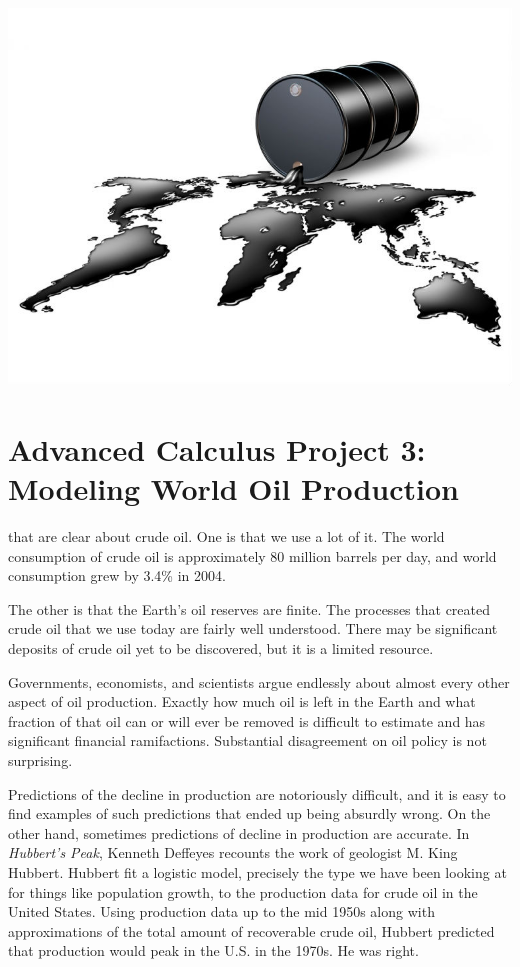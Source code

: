 \documentclass
[justified,nohyper]
{tufte-handout}
\begin{document}
\begin{center}
\includegraphics[scale=0.3]{oil.jpg}
\end{center}
\section{Advanced Calculus Project 3: Modeling World Oil Production}
 that are clear about crude oil. One is that we use a lot of it. The world consumption of crude oil is approximately 80 million barrels per day, and world consumption grew by 3.4\% in 2004.

The other is that the Earth's oil reserves are finite. The processes that created crude oil that we use today are fairly well understood. There may be significant deposits of crude oil yet to be discovered, but it is a limited resource.

Governments, economists, and scientists argue endlessly about almost every other aspect of oil production. Exactly how much oil is left in the Earth and what fraction of that oil can or will ever be removed is difficult to estimate and has significant financial ramifactions. Substantial disagreement on oil policy is not surprising.

Predictions of the decline in production are notoriously difficult, and it is easy to find examples of such predictions that ended up being absurdly wrong. On the other hand, sometimes predictions of decline in production are accurate. In \textit{Hubbert's Peak}, Kenneth Deffeyes recounts the work of geologist M. King Hubbert. Hubbert fit a logistic model, precisely the type we have been looking at for things like population growth, to the production data for crude oil in the United States. Using production data up to the mid 1950s along with approximations of the total amount of recoverable crude oil, Hubbert predicted that production would peak in the U.S. in the 1970s. He was right.
\end{document}
